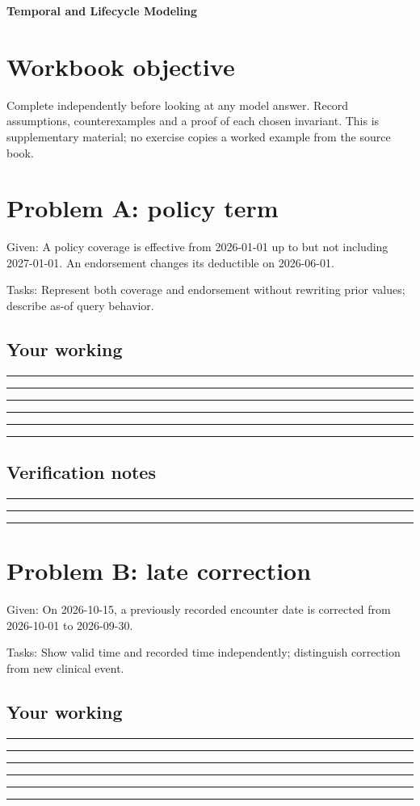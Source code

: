 \documentclass[11pt,letterpaper]{article}
\newcommand{\ResponseLine}{\par\vspace{1.05em}\noindent\rule{\linewidth}{0.4pt}\par}
\newcommand{\ResponseArea}{\ResponseLine\ResponseLine\ResponseLine}
\begin{document}
\begin{center}
{\LARGE\bfseries\color{navy} Temporal and Lifecycle Modeling}\par
\vspace{0.25em}{\large Guided workbook | conceptual and operational analysis}\par
{}
\end{center}
\vspace{0.8em}
\section{Workbook objective}
Complete independently before looking at any model answer. Record assumptions, counterexamples and a proof of each chosen invariant. This is supplementary material; no exercise copies a worked example from the source book.


\section{Problem A: policy term}
Given: A policy coverage is effective from 2026-01-01 up to but not including 2027-01-01. An endorsement changes its deductible on 2026-06-01.

Tasks: Represent both coverage and endorsement without rewriting prior values; describe as-of query behavior.

\subsection{Your working}
\ResponseArea\ResponseArea
\subsection{Verification notes}
\ResponseArea

\section{Problem B: late correction}
Given: On 2026-10-15, a previously recorded encounter date is corrected from 2026-10-01 to 2026-09-30.

Tasks: Show valid time and recorded time independently; distinguish correction from new clinical event.

\subsection{Your working}
\ResponseArea\ResponseArea
\end{document}
